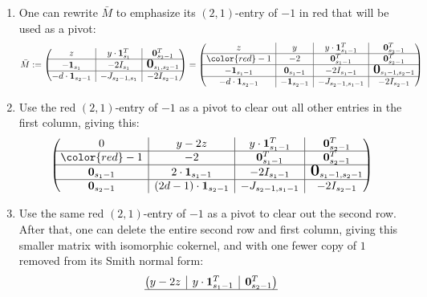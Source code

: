 \documentclass[10pt,reqno]{amsart}
\newcommand{\bigzero}{\mbox{\normalfont\Large\bfseries 0}}
\newcommand{\rvline}{\hspace*{-\arraycolsep}\vline\hspace*{-\arraycolsep}}
\def\onesvector{\mathbf{1}}
\def\zerovector{\mathbf{0}}
\begin{document}
\begin{enumerate}
\item One can rewrite $\bar{M}$ to emphasize its
$(2,1)$-entry of $-1$ in red that will be used as a pivot:
$$
\bar{M}:=\begin{pmatrix}
z & \rvline & y \cdot\onesvector^T_{s_1} & \rvline & \zerovector^T_{s_2-1} \\
\hline
-\onesvector_{s_1} & \rvline & -2I_{s_1} & \rvline & \bigzero_{s_1,s_2-1} \\
\hline
-d \cdot \onesvector_{s_2-1} & \rvline & - J_{s_2-1,s_1} & \rvline & -2 I_{s_2-1} 
\end{pmatrix}
=
\begin{pmatrix}
z & \rvline &y&\rvline& y \cdot\onesvector^T_{s_1-1} & \rvline & \zerovector^T_{s_2-1} \\
\hline
{\color{red}-1} & \rvline &-2 &\rvline & \zerovector_{s_1-1}^T& \rvline&\zerovector_{s_2-1}^T  \\\hline
-\onesvector_{s_1-1} & \rvline & \zerovector_{s_1-1}&\rvline& -2I_{s_1-1} & \rvline & \bigzero_{s_1-1,s_2-1} \\
\hline
-d \cdot \onesvector_{s_2-1} & \rvline&-\onesvector_{s_2-1} &\rvline & - J_{s_2-1,s_1-1} & \rvline & -2 I_{s_2-1} 
\end{pmatrix}
$$
\item Use the red $(2,1)$-entry of $-1$ as a pivot to clear out all other entries in the first column, giving this:
$$
\begin{pmatrix}
0 & \rvline &y-2z&\rvline& y \cdot\onesvector^T_{s_1-1} & \rvline & \zerovector^T_{s_2-1} \\
\hline
{\color{red}-1} & \rvline &-2 &\rvline & \zerovector_{s_1-1}^T& \rvline&\zerovector_{s_2-1}^T  \\\hline
\zerovector_{s_1-1} & \rvline & 2\cdot\onesvector_{s_1-1}&\rvline& -2I_{s_1-1} & \rvline & \bigzero_{s_1-1,s_2-1} \\
\hline
\zerovector_{s_2-1} & \rvline&(2d-1)\cdot \onesvector_{s_2-1} &\rvline & - J_{s_2-1,s_1-1} & \rvline & -2 I_{s_2-1} 
\end{pmatrix}
$$
\item Use the same red $(2,1)$-entry of $-1$ as a pivot to clear out the second row.  After that, one can delete the entire second row and first column, giving this smaller matrix with isomorphic cokernel, and with one fewer copy of $1$ removed from its Smith normal form:
$$
\begin{pmatrix}
y-2z&\rvline& y \cdot\onesvector^T_{s_1-1} & \rvline & \zerovector^T_{s_2-1} \\\hline

\end{pmatrix}$$
\end{enumerate}
\end{document}
